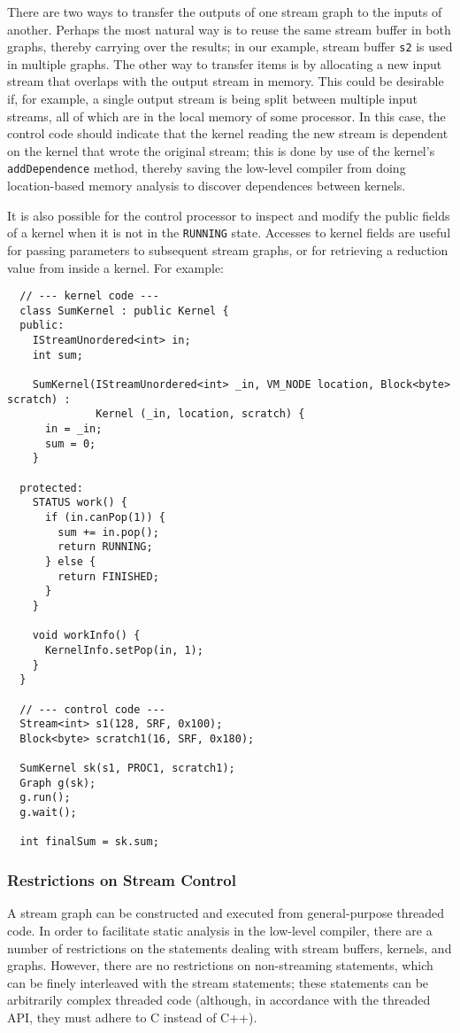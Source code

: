 There are two ways to transfer the outputs of one stream graph to the
inputs of another.  Perhaps the most natural way is to reuse the same
stream buffer in both graphs, thereby carrying over the results; in
our example, stream buffer {\tt s2} is used in multiple graphs.  The
other way to transfer items is by allocating a new input stream that
overlaps with the output stream in memory.  This could be desirable
if, for example, a single output stream is being split between
multiple input streams, all of which are in the local memory of some
processor.  In this case, the control code should indicate that the
kernel reading the new stream is dependent on the kernel that wrote
the original stream; this is done by use of the kernel's {\tt
addDependence} method, thereby saving the low-level compiler from
doing location-based memory analysis to discover dependences between
kernels.

It is also possible for the control processor to inspect and modify
the public fields of a kernel when it is not in the {\tt RUNNING}
state.  Accesses to kernel fields are useful for passing parameters to
subsequent stream graphs, or for retrieving a reduction value from
inside a kernel.  For example: 
{\small
\begin{verbatim}
  // --- kernel code ---
  class SumKernel : public Kernel {
  public:
    IStreamUnordered<int> in;
    int sum;

    SumKernel(IStreamUnordered<int> _in, VM_NODE location, Block<byte> scratch) : 
              Kernel (_in, location, scratch) {
      in = _in;
      sum = 0;
    }

  protected:
    STATUS work() {
      if (in.canPop(1)) {
        sum += in.pop();
        return RUNNING;
      } else {
        return FINISHED;
      }
    }

    void workInfo() {
      KernelInfo.setPop(in, 1);
    }
  }

  // --- control code ---
  Stream<int> s1(128, SRF, 0x100);
  Block<byte> scratch1(16, SRF, 0x180);

  SumKernel sk(s1, PROC1, scratch1);
  Graph g(sk);
  g.run();
  g.wait();

  int finalSum = sk.sum;
\end{verbatim}}

\subsubsection{Restrictions on Stream Control}

A stream graph can be constructed and executed from general-purpose
threaded code.  In order to facilitate static analysis in the
low-level compiler, there are a number of restrictions on the
statements dealing with stream buffers, kernels, and graphs.  However,
there are no restrictions on non-streaming statements, which can be
finely interleaved with the stream statements; these statements can be
arbitrarily complex threaded code (although, in accordance with the
threaded API, they must adhere to C instead of C++).

